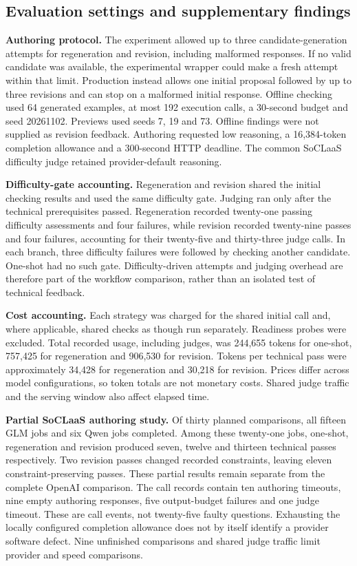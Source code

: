 \subsection{Evaluation settings and supplementary findings}\label{app:evaluation-details}

\textbf{Authoring protocol.} The experiment allowed up to three candidate-generation attempts for regeneration and revision, including malformed responses. If no valid candidate was available, the experimental wrapper could make a fresh attempt within that limit. Production instead allows one initial proposal followed by up to three revisions and can stop on a malformed initial response. Offline checking used 64 generated examples, at most 192 execution calls, a 30-second budget and seed 20261102. Previews used seeds 7, 19 and 73. Offline findings were not supplied as revision feedback. Authoring requested low reasoning, a 16,384-token completion allowance and a 300-second HTTP deadline. The common SoCLaaS difficulty judge retained provider-default reasoning.

\textbf{Difficulty-gate accounting.} Regeneration and revision shared the initial checking results and used the same difficulty gate. Judging ran only after the technical prerequisites passed. Regeneration recorded twenty-one passing difficulty assessments and four failures, while revision recorded twenty-nine passes and four failures, accounting for their twenty-five and thirty-three judge calls. In each branch, three difficulty failures were followed by checking another candidate. One-shot had no such gate. Difficulty-driven attempts and judging overhead are therefore part of the workflow comparison, rather than an isolated test of technical feedback.

\textbf{Cost accounting.} Each strategy was charged for the shared initial call and, where applicable, shared checks as though run separately. Readiness probes were excluded. Total recorded usage, including judges, was 244,655 tokens for one-shot, 757,425 for regeneration and 906,530 for revision. Tokens per technical pass were approximately 34,428 for regeneration and 30,218 for revision. Prices differ across model configurations, so token totals are not monetary costs. Shared judge traffic and the serving window also affect elapsed time.

\textbf{Partial SoCLaaS authoring study.}\label{app:soclaas-study} Of thirty planned comparisons, all fifteen GLM jobs and six Qwen jobs completed. Among these twenty-one jobs, one-shot, regeneration and revision produced seven, twelve and thirteen technical passes respectively. Two revision passes changed recorded constraints, leaving eleven constraint-preserving passes. These partial results remain separate from the complete OpenAI comparison. The call records contain ten authoring timeouts, nine empty authoring responses, five output-budget failures and one judge timeout. These are call events, not twenty-five faulty questions. Exhausting the locally configured completion allowance does not by itself identify a provider software defect. Nine unfinished comparisons and shared judge traffic limit provider and speed comparisons.

